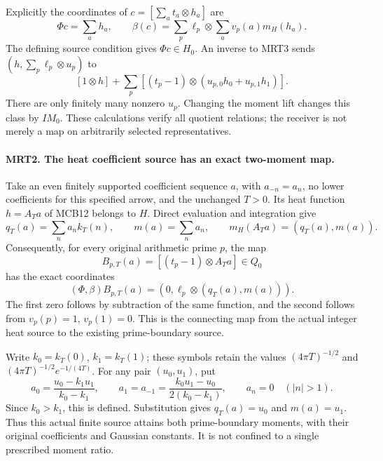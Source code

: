Explicitly the coordinates of \(c=[\sum_a t_a\otimes h_a]\) are
\[
 \Phi c=\sum_a h_a,\qquad
 \beta(c)=\sum_p\ell_p\otimes\sum_a v_p(a)m_H(h_a).          \tag{MRT4}
\]
The defining source condition gives \(\Phi c\in H_0\).
An inverse to MRT3 sends \((h,\sum_p\ell_p\otimes u_p)\)
to
\[
 [1\otimes h]+\sum_p[(t_p-1)\otimes
                    (u_{p,0}h_0+u_{p,1}h_1)] .             \tag{MRT5}
\]
There are only finitely many nonzero \(u_p\). Changing the
moment lift changes this class by \(IM_0\). These calculations
verify all quotient relations; the receiver is not merely a
map on arbitrarily selected representatives.

\paragraph{MRT2. The heat coefficient source has an exact two-moment map.}
Take an even finitely supported coefficient sequence \(a\), with
\(a_{-n}=a_n\), no lower coefficients for this specified arrow,
and the unchanged \(T>0\). Its heat function \(h=A_Ta\) of
MCB12 belongs to \(H\). Direct evaluation and integration give
\[
 q_T(a)=\sum_n a_n k_T(n),\qquad m(a)=\sum_n a_n,\qquad
 m_H(A_Ta)=(q_T(a),m(a)).                                  \tag{MRT6}
\]
Consequently, for every original arithmetic prime \(p\), the map
\[
 B_{p,T}(a)=[(t_p-1)\otimes A_Ta]\in Q_0
\]
has the exact coordinates
\[
 (\Phi,\beta)B_{p,T}(a)
        =(0,\ell_p\otimes(q_T(a),m(a))).                   \tag{MRT7}
\]
The first zero follows by subtraction of the same function, and
the second follows from \(v_p(p)=1\), \(v_p(1)=0\).
This is the connecting map from the actual integer heat source
to the existing prime-boundary source.

Write \(k_0=k_T(0)\), \(k_1=k_T(1)\); these symbols retain
the values \((4\pi T)^{-1/2}\) and
\((4\pi T)^{-1/2}e^{-1/(4T)}\). For any pair \((u_0,u_1)\),
put
\[
 a_0=\frac{u_0-k_1u_1}{k_0-k_1},\qquad
 a_{1}=a_{-1}=\frac{k_0u_1-u_0}{2(k_0-k_1)},\qquad
 a_n=0\quad(|n|>1).                                      \tag{MRT8}
\]
Since \(k_0>k_1\), this is defined. Substitution gives
\(q_T(a)=u_0\) and \(m(a)=u_1\). Thus this actual finite
source attains both prime-boundary moments, with their original
coefficients and Gaussian constants. It is not confined to a
single prescribed moment ratio.

